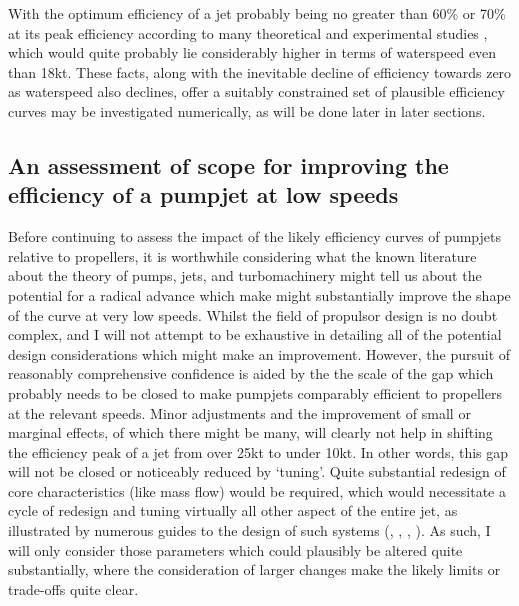 \documentclass{article}\usepackage[]{graphicx}\usepackage[]{color}
\begin{document}
With the optimum efficiency of a jet probably being no greater than 60\% or 70\% at its peak efficiency according to many theoretical and experimental studies \parencite{lu2016cfd}, which would quite probably lie considerably higher in terms of waterspeed even than 18kt. These facts, along with the inevitable decline of efficiency towards zero as waterspeed also declines, offer a suitably constrained set of plausible efficiency curves may be investigated numerically, as will be done later in later sections.

\subsection{An assessment of scope for improving the efficiency of a pumpjet at low speeds}
Before continuing to assess the impact of the likely efficiency curves of pumpjets relative to propellers, it is worthwhile considering what the known literature about the theory of pumps, jets, and turbomachinery might tell us about the potential for a radical advance which make might substantially improve the shape of the curve at very low speeds.  Whilst the field of propulsor design is no doubt complex, and I will not attempt to be exhaustive in detailing all of the potential design considerations which might make an improvement.  However, the pursuit of reasonably comprehensive confidence is aided by the the scale of the gap which probably needs to be closed to make pumpjets comparably efficient to propellers at the relevant speeds.  Minor adjustments and the improvement of small or marginal effects, of which there might be many, will clearly not help in shifting the efficiency peak of a jet from over 25kt to under 10kt.  In other words, this gap will not be closed or noticeably reduced by `tuning'.  Quite substantial redesign of core characteristics (like mass flow) would be required, which would necessitate a cycle of redesign and tuning virtually all other aspect of the entire jet, as illustrated by numerous guides to the design of such systems (\cite{bruce1974}, \cite{furuya1988}, \cite{mccormick1963design}, \cite{henderson1964}).  As such, I will only consider those parameters which could plausibly be altered quite substantially, where the consideration of larger changes make the likely limits or trade-offs quite clear.
\end{document}
